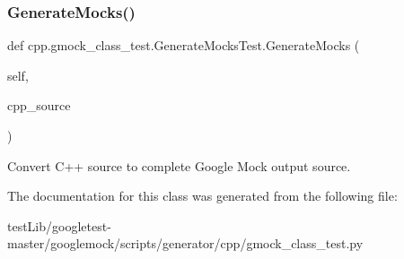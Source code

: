 \subsubsection{\texorpdfstring{Generate\+Mocks()}{GenerateMocks()}}
{\footnotesize\ttfamily def cpp.\+gmock\+\_\+class\+\_\+test.\+Generate\+Mocks\+Test.\+Generate\+Mocks (\begin{DoxyParamCaption}\item[{}]{self,  }\item[{}]{cpp\+\_\+source }\end{DoxyParamCaption})}

\begin{DoxyVerb}Convert C++ source to complete Google Mock output source.\end{DoxyVerb}
 

The documentation for this class was generated from the following file\+:\begin{DoxyCompactItemize}
\item 
test\+Lib/googletest-\/master/googlemock/scripts/generator/cpp/gmock\+\_\+class\+\_\+test.\+py\end{DoxyCompactItemize}
